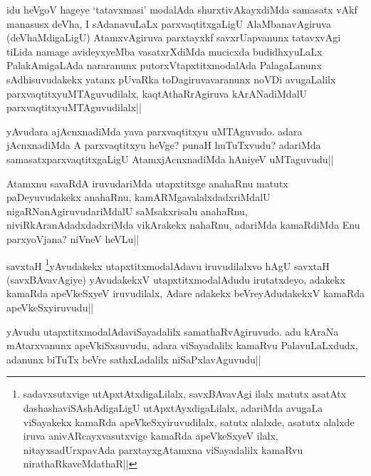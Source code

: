 
\begin{artha}
idu heVgoV hageye `tatavxmasi' modalAda shurxtivAkayxdiMda samasatx vAkf manasusx deVha, I sAdanavuLaLx parxvaqtitxgaLigU  AlaMbanavAgiruva (deVhaMdigaLigU) AtamxvAgiruva parxtayxkf savxrUapvanunx tatavxvAgi tiLida namage avideyxyeMba vasatxrXdiMda mucicxda budidhxyuLaLx PalakAmigaLAda nararanunx putorxVtapxtitxmodalAda PalagaLanunx sAdhisuvudakekx yatanx pUvaRka toDagiruvavaranunx noVDi avugaLalilx parxvaqtitxyuMTAguvudilalx, kaqtAthaRrAgiruva kArANadiMdalU parxvaqtitxyuMTAguvudilalx||
\end{artha}

\begin{artha}
yAvudara ajAcnxnadiMda yava parxvaqtitxyu uMTAguvudo. adara jAcnxnadiMda A parxvaqtitxyu heVge? punaH huTuTxvudu? adariMda samasatxparxvaqtitxgaLigU AtamxjAcnxnadiMda hAniyeV uMTaguvudu||
\end{artha}

\begin{artha}
Atamxnu savaRdA iruvudariMda utapxtitxge anahaRnu matutx paDeyuvudakekx anahaRnu, kamARMgavalalxdadxriMdalU nigaRNanAgiruvudariMdalU saMsakxrisalu anahaRnu, niviRkAranAdadxdadxriMda vikArakekx nahaRnu, adariMda kamaRdiMda Enu parxyoVjana? niVneV heVLu||
\end{artha}

\begin{artha}
savxtaH \footnote{sadavxsutxvige utApxtAtxdigaLilalx, savxBAvavAgi ilalx matutx asatAtx dashashaviSAshAdigaLigU utApxtAyxdigaLilalx, adariMda avugaLa viSayakekx kamaRda apeVkeSxyiruvudilalx, satutx alalxde, asatutx alalxde iruva anivARcayxvasutxvige kamaRda apeVkeSxyeV ilalx, nitayxsadUrxpavAda parxtayxgAtamxna viSayadalilx kamaRvu nirathaRkaveMdathaR||}yAvudakekx utapxtitxmodalAdavu iruvudilalxvo hAgU savxtaH (savxBAvavAgiye) yAvudakekxV utapxtitxmodalAdudu irutatxdeyo, adakekx kamaRda apeVkeSxyeV iruvudilalx, Adare adakekx beVreyAdudakekxV kamaRda apeVkeSxyiruvudu||
\end{artha}


\begin{artha}
yAvudu utapxtitxmodalAdaviSayadalilx samathaRvAgiruvudo. adu kAraNa mAtarxvanunx 
apeVkiSxsuvudu, adara viSayadalilx kamaRvu PalavuLaLxdudx, adanunx biTuTx beVre 
sathxLadalilx niSaPxlavAguvudu||
\end{artha}

